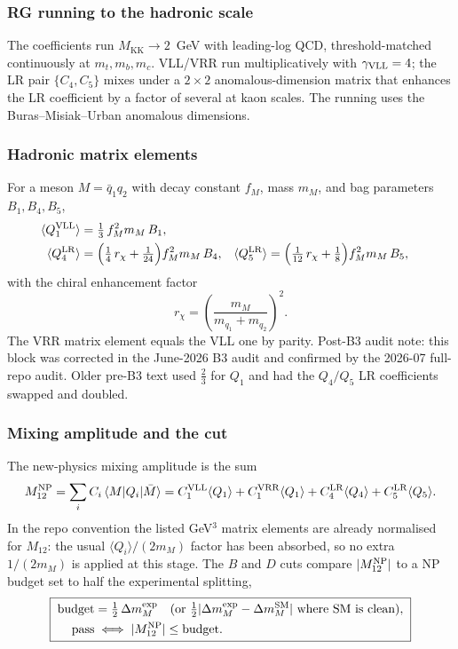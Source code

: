 \documentclass[11pt]{article}
\newcommand{\MKK}{M_{\mathrm{KK}}}
\newcommand{\Mtwelve}{M_{12}}
\begin{document}
\subsubsection*{RG running to the hadronic scale}
The coefficients run $\MKK\to2$~GeV with leading-log QCD, threshold-matched
continuously at $m_t,m_b,m_c$. VLL/VRR run multiplicatively with
$\gamma_{\rm VLL}=4$; the LR pair $\{C_4,C_5\}$ mixes under a $2\times2$
anomalous-dimension matrix that enhances the LR coefficient by a factor of several
at kaon scales. The running uses the Buras--Misiak--Urban anomalous dimensions.

\subsubsection*{Hadronic matrix elements}
For a meson $M=\bar q_1 q_2$ with decay constant $f_M$, mass $m_M$, and bag
parameters $B_1,B_4,B_5$,
\begin{align}
\langle Q_1^{\rm VLL}\rangle &= \tfrac{1}{3}\,f_M^2 m_M\,B_1, \\
\langle Q_4^{\rm LR}\rangle &= \Big(\tfrac{1}{4}\,r_\chi+\tfrac{1}{24}\Big)f_M^2 m_M\,B_4, &
\langle Q_5^{\rm LR}\rangle &= \Big(\tfrac{1}{12}\,r_\chi+\tfrac{1}{8}\Big)f_M^2 m_M\,B_5,
\end{align}
with the chiral enhancement factor
\begin{equation}
r_\chi = \left(\frac{m_M}{m_{q_1}+m_{q_2}}\right)^2 .
\end{equation}
The VRR matrix element equals the VLL one by parity.
Post-B3 audit note: this block was corrected in the June-2026 B3 audit and
confirmed by the 2026-07 full-repo audit. Older pre-B3 text used
$\tfrac23$ for $Q_1$ and had the $Q_4/Q_5$ LR coefficients swapped and doubled.

\subsubsection*{Mixing amplitude and the cut}
The new-physics mixing amplitude is the sum
\begin{equation}
\Mtwelve^{\rm NP} = \sum_i C_i\,\langle M|Q_i|\bar M\rangle
= C_1^{\rm VLL}\langle Q_1\rangle + C_1^{\rm VRR}\langle Q_1\rangle
+ C_4^{\rm LR}\langle Q_4\rangle + C_5^{\rm LR}\langle Q_5\rangle .
\end{equation}
In the repo convention the listed GeV$^3$ matrix elements are already
normalised for $M_{12}$: the usual $\langle Q_i\rangle/(2m_M)$ factor has been
absorbed, so no extra $1/(2m_M)$ is applied at this stage. The $B$ and $D$ cuts
compare $|\Mtwelve^{\rm NP}|$ to a NP budget set to half the experimental
splitting,
\begin{equation}
\boxed{\;
\begin{aligned}
\text{budget}
&=\tfrac12\,\Delta m_M^{\rm exp}
\quad(\text{or }\tfrac12|\Delta m_M^{\rm exp}-\Delta m_M^{\rm SM}|\text{ where SM is clean}),\\
\text{pass}
&\iff |\Mtwelve^{\rm NP}|\le\text{budget}.
\end{aligned}
\;}
\end{equation}
\end{document}
